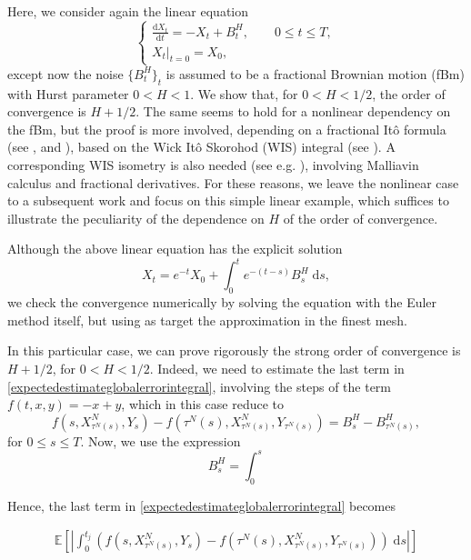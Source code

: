 \documentclass[reqno,12pt]{amsart}
\theoremstyle{plain}%
\theoremstyle{definition}
\begin{document}
Here, we consider again the linear equation
\begin{equation}
    \label{linearnonhomogeneousrode2}
    \begin{cases}
        \displaystyle \frac{\mathrm{d}X_t}{\mathrm{d} t} = -X_t + B^H_t, \qquad 0 \leq t \leq T, \\
        \left. X_t \right|_{t = 0} = X_0,
      \end{cases}
\end{equation}
except now the noise $\{B^H_t\}_t$ is assumed to be a fractional Brownian motion (fBm) with Hurst parameter $0 < H < 1$. We show that, for $0 < H < 1/2$, the order of convergence is $H + 1/2$. The same seems to hold for a nonlinear dependency on the fBm, but the proof is more involved, depending on a fractional It\^o formula (see \cite[Theorem 4.2.6]{BHOB2008}, \cite[Theorem 4.1]{Bender2003}and \cite[Theorem 2.7.4]{Mishura2008}), based on the Wick It\^o Skorohod (WIS) integral (see \cite[Chapter 4]{BHOB2008}). A corresponding WIS isometry is also needed (see e.g. \cite[Theorem 4.5.6]{BHOB2008}), involving Malliavin calculus and fractional derivatives. For these reasons, we leave the nonlinear case to a subsequent work and focus on this simple linear example, which suffices to illustrate the peculiarity of the dependence on $H$ of the order of convergence.

Although the above linear equation has the explicit solution
\begin{equation}
    X_t = e^{-t}X_0 + \int_0^t e^{-(t-s)}B^H_s\;\mathrm{d}s,
\end{equation}
we check the convergence numerically by solving the equation with the Euler method itself, but using as target the approximation in the finest mesh.

In this particular case, we can prove rigorously the strong order of convergence is $H+1/2$, for $0 < H < 1/2$. Indeed, we need to estimate the last term in \eqref{expectedestimateglobalerrorintegral}, involving the steps of the term $f(t, x, y) = -x + y$, which in this case reduce to
\[
    f(s, X_{\tau^N(s)}^N, Y_s) - f(\tau^N(s), X_{\tau^N(s)}^N, Y_{\tau^N(s)}) = B^H_s - B^H_{\tau^N(s)},
\]
for $0 \leq s \leq T$. Now, we use the expression
\[
    B^H_s = \int_0^s 
\]

Hence, the last term in \eqref{expectedestimateglobalerrorintegral} becomes

\begin{align*}
    \mathbb{E}\left[\left|\int_0^{t_j} \left( f(s, X_{\tau^N(s)}^N, Y_s) - f(\tau^N(s), X_{\tau^N(s)}^N, Y_{\tau^N(s)}) \right)\;\mathrm{d}s\right|\right]
\end{align*}
\end{document}
